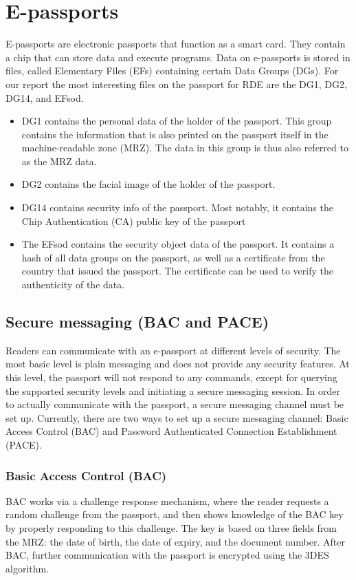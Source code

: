\section{E-passports}
\label{sec:e-passports}
E-passports are electronic passports that function as a smart card.
They contain a chip that can store data and execute programs.
Data on e-passports is stored in files, called Elementary Files (EFs) containing certain Data Groups (DGs).
For our report the most interesting files on the passport for RDE are the DG1, DG2, DG14, and EFsod.
\begin{itemize}
    \item DG1 contains the personal data of the holder of the passport.
    This group contains the information that is also printed on the passport itself in the machine-readable zone (MRZ).
    The data in this group is thus also referred to as the MRZ data.
    \item DG2 contains the facial image of the holder of the passport.
    \item DG14 contains security info of the passport.
    Most notably, it contains the Chip Authentication (CA) public key of the passport
    \item The EFsod contains the security object data of the passport.
    It contains a hash of all data groups on the passport, as well as a certificate from the country that issued the passport.
    The certificate can be used to verify the authenticity of the data.
\end{itemize}

\subsection{Secure messaging (BAC and PACE)}\label{subsec:secure-messaging}
Readers can communicate with an e-passport at different levels of security.
The most basic level is plain messaging and does not provide any security features.
At this level, the passport will not respond to any commands, except for querying the supported security levels and initiating a secure messaging session.
In order to actually communicate with the passport, a secure messaging channel must be set up.
Currently, there are two ways to set up a secure messaging channel: Basic Access Control (BAC) and Password Authenticated Connection Establishment (PACE).

\subsubsection{Basic Access Control (BAC)}\label{subsubsec:basic-access-control}
BAC works via a challenge response mechanism, where the reader requests a random challenge from the passport, and then shows knowledge of the BAC key by properly responding to this challenge.
The key is based on three fields from the MRZ: the date of birth, the date of expiry, and the document number.
After BAC, further communication with the passport is encrypted using the 3DES algorithm.

